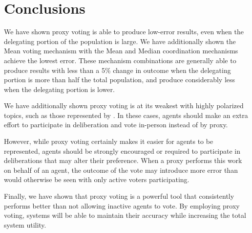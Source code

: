 \section{Conclusions}\label{sec:conclusions}
We have shown proxy voting is able to produce low-error results, even when the
delegating portion of the population is large.
We have additionally shown the Mean voting mechanism with the Mean and Median
coordination mechanisms achieve the lowest error.
These mechanism combinations are generally able to produce results with less than a 5\%
change in outcome when the delegating portion is more than half the total
population, and produce considerably less when the delegating portion is lower.

We have additionally shown proxy voting is at its weakest with highly polarized
topics, such as those represented by .
In these cases, agents should make an extra effort to participate in deliberation and
vote in-person instead of by proxy.

However, while proxy voting certainly makes it easier for agents to be represented,
agents should be strongly encouraged or required to participate in deliberations that
may alter their preference.
When a proxy performs this work on behalf of an agent, the outcome of the vote may
introduce more error than would otherwise be seen with only active voters participating.

Finally, we have shown that proxy voting is a powerful tool that consistently
performs better than not allowing inactive agents to vote.
By employing proxy voting, systems will be able to maintain their accuracy while
increasing the total system utility.
